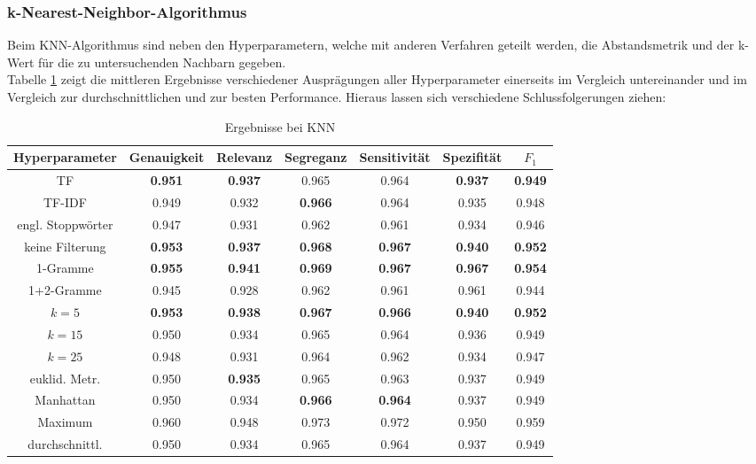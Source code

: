 \subsubsection{k-Nearest-Neighbor-Algorithmus}
Beim KNN-Algorithmus sind neben den Hyperparametern, welche mit anderen Verfahren geteilt werden, die Abstandsmetrik und der k-Wert für die zu untersuchenden Nachbarn gegeben.\\
Tabelle \ref{results-knn} zeigt die mittleren Ergebnisse verschiedener Ausprägungen aller Hyperparameter einerseits im Vergleich untereinander und im Vergleich zur durchschnittlichen und zur besten Performance. Hieraus lassen sich verschiedene Schlussfolgerungen ziehen:\\
\begin{table}[htb]
	\begin{center}
		\begin{tabular}{|c|c|c|c|c|c|c|}
			\hline 
			Hyperparameter & Genauigkeit & Relevanz & Segreganz & Sensitivität & Spezifität & $F_1$ \\ \hline \hline
			TF & \textbf{0.951} & \textbf{0.937} & 0.965 & 0.964 & \textbf{0.937} & \textbf{0.949} \\ \hline
			TF-IDF  & 0.949 & 0.932 & \textbf{0.966} & 0.964 & 0.935 & 0.948 \\ \hline \hline
			engl. Stoppwörter  & 0.947 & 0.931 & 0.962 & 0.961 & 0.934 & 0.946 \\ \hline
			keine Filterung  & \textbf{0.953} & \textbf{0.937} & \textbf{0.968} & \textbf{0.967} & \textbf{0.940} & \textbf{0.952} \\ \hline \hline
			1-Gramme  & \textbf{0.955} & \textbf{0.941} & \textbf{0.969} & \textbf{0.967} & \textbf{0.967} & \textbf{0.954} \\ \hline 
			1+2-Gramme  & 0.945 & 0.928 & 0.962 & 0.961 & 0.961 & 0.944 \\ \hline \hline
			$k = 5$  & \textbf{0.953} & \textbf{0.938} & \textbf{0.967} & \textbf{0.966} & \textbf{0.940} & \textbf{0.952} \\ \hline 
			$k = 15$  & 0.950  & 0.934  & 0.965  & 0.964 & 0.936  & 0.949 \\ \hline 
			$k = 25$  & 0.948  & 0.931  & 0.964  & 0.962 & 0.934  & 0.947  \\ \hline \hline
			euklid. Metr.  & 0.950 & \textbf{0.935} & 0.965 & 0.963 & 0.937 & 0.949 \\ \hline
			Manhattan  & 0.950 & 0.934 & \textbf{0.966} &\textbf{0.964} & 0.937 & 0.949 \\ \hline
			 \hline
			Maximum  & 0.960 & 0.948 & 0.973 & 0.972 & 0.950 & 0.959 \\ \hline
			durchschnittl. & 0.950 & 0.934 & 0.965 & 0.964 & 0.937 & 0.949 \\ \hline
		\end{tabular}
		\caption{Ergebnisse bei KNN}\label{results-knn}
	\end{center}
\end{table}\\\\
